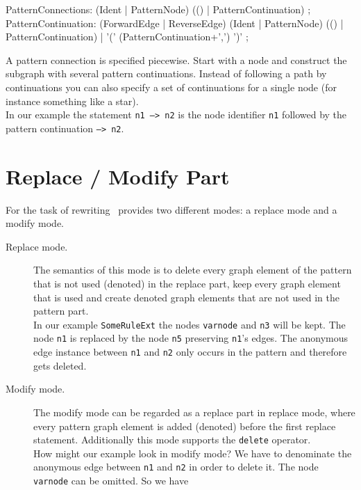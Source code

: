 \begin{rail}     
  PatternConnections: (Ident | PatternNode) (() | PatternContinuation) ;
  PatternContinuation: (ForwardEdge | ReverseEdge) (Ident | PatternNode) (() | PatternContinuation) |
    '(' (PatternContinuation+',') ')' ; 
\end{rail}
A pattern connection is specified piecewise. Start with a node and construct the subgraph with several pattern continuations. Instead of following a path by continuations you can also specify a set of continuations for a single node (for instance something like a star).\\
In our example the statement \texttt{n1 --> n2} is the node identifier \texttt{n1} followed by the pattern continuation \texttt{--> n2}.

\section{Replace / Modify Part}
\label{replacepart}
For the task of rewriting \GrG\ provides two different modes: a replace mode and a modify mode.
\begin{description}
  \item[Replace mode.] The semantics of this mode is to delete every graph element of the pattern that is not used (denoted) in the replace part, keep every graph element that is used and create denoted graph elements that are not used in the pattern part.\\
  In our example \texttt{SomeRuleExt} the nodes \texttt{varnode} and \texttt{n3} will be kept. The node \texttt{n1} is replaced by the node \texttt{n5} preserving \texttt{n1}'s edges. The anonymous edge instance between \texttt{n1} and \texttt{n2} only occurs in the pattern and therefore gets deleted.
  \item[Modify mode.] The modify mode can be regarded as a replace part in replace mode, where every pattern graph element is added (denoted) before the first replace statement. Additionally this mode supports the \texttt{delete} operator.\\
  How might our example look in modify mode? We have to denominate the anonymous edge between \texttt{n1} and \texttt{n2} in order to delete it. The node \texttt{varnode} can be omitted. So we have
\begin{grgen}
rule SomeRuleExt(varnode: Node): (Node, EdgeTypeB) {
  pattern {
    ...
    n1 -e0:Edge-> n2;
    ...
  }
  modify {
    n5 : NodeTypeC<n1>;
    n3 -e1:EdgeTypeB-> n5;
    delete(e0);
    eval {
      ...
\end{grgen}
\end{description}

